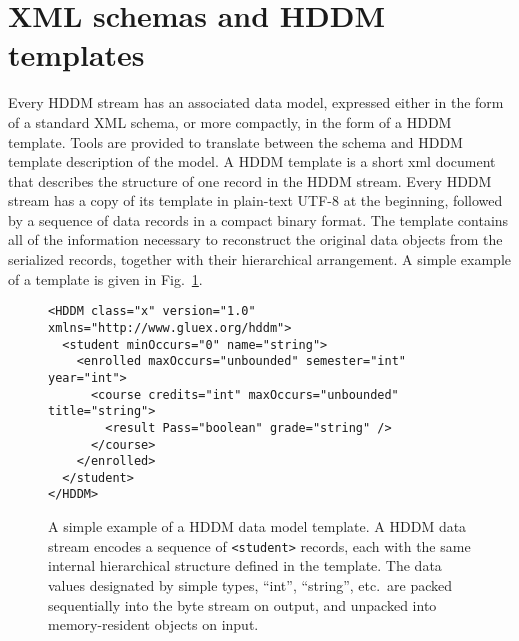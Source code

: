 \documentclass{revtex4}
\begin{document}
\section{XML schemas and HDDM templates}

Every HDDM stream has an associated data model, expressed either in the form of a
standard XML schema, or more compactly, in the form of a HDDM template.  Tools are
provided to translate between the schema and HDDM template description of the model.
A HDDM template is a short xml document that describes the structure of one record
in the HDDM stream. Every HDDM stream has a copy of its template in plain-text
UTF-8 at the beginning, followed by a sequence of data records in a compact binary
format. The template contains all of the information necessary to reconstruct the
original data objects from the serialized records, together with their hierarchical
arrangement. A simple example of a template is given in Fig.~\ref{simple_template}.

\begin{figure}
\begin{minipage}{12cm}
\begin{verbatim}
<HDDM class="x" version="1.0" xmlns="http://www.gluex.org/hddm">
  <student minOccurs="0" name="string">
    <enrolled maxOccurs="unbounded" semester="int" year="int">
      <course credits="int" maxOccurs="unbounded" title="string">
        <result Pass="boolean" grade="string" />
      </course>
    </enrolled>
  </student>
</HDDM>
\end{verbatim}
\end{minipage}
\caption{\label{simple_template}
A simple example of a HDDM data model template. A HDDM data stream encodes a
sequence of \texttt{<student>} records, each with the same internal hierarchical
structure defined in the template. The data values designated by simple types,
``int'', ``string'', etc.\ are packed sequentially into the byte stream on output,
and unpacked into memory-resident objects on input.}
\end{figure}
\end{document}
